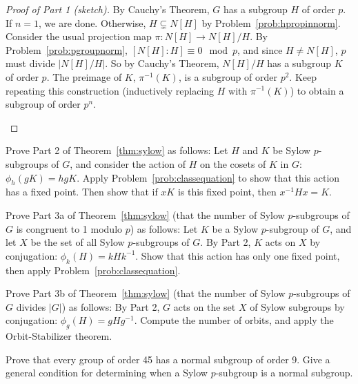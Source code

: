 \begin{proof}[Proof of Part 1 (sketch)]
 By Cauchy's Theorem, $G$ has a subgroup $H$ of order $p$. If $n=1$, we are done. Otherwise, $H \subsetneq N[H]$ by Problem~\ref{prob:hpropinnorm}. Consider the usual projection map $\pi:N[H]\longrightarrow N[H]/H$. By Problem~\ref{prob:pgroupnorm}, $[N[H]:H] \equiv 0 \mod p$, and since $H \neq N[H]$, $p$ must divide $\lvert N[H]/H \rvert$. So by Cauchy's Theorem, $N[H]/H$ has a subgroup $K$ of order $p$. The preimage of $K$, $\pi^{-1}(K)$, is a subgroup of order $p^2$. Keep repeating this construction (inductively replacing $H$ with $\pi^{-1}(K)$) to obtain a subgroup of order $p^n$.
\begin{annotation}
\end{annotation}
\end{proof}

\begin{problem}\label{prob:sylowII}
Prove Part 2 of Theorem~\ref{thm:sylow} as follows: Let $H$ and $K$ be Sylow $p$-subgroups of $G$, and consider the action of $H$ on the cosets of $K$ in $G$: $\phi_h(gK)=hgK$. Apply Problem~\ref{prob:classequation} to show that this action has a fixed point. Then show that if $xK$ is this fixed point, then $x^{-1}Hx=K$.
\end{problem}

\begin{problem}\label{prob:sylowIII}
Prove Part 3a of Theorem~\ref{thm:sylow} (that the number of Sylow $p$-subgroups of $G$ is congruent to 1 modulo $p$) as follows: Let $K$ be a Sylow $p$-subgroup of $G$, and let $X$ be the set of all Sylow $p$-subgroups of $G$. By Part 2, $K$ acts on $X$ by conjugation: $\phi_k(H) = kHk^{-1}$. Show that this action has only one fixed point, then apply Problem~\ref{prob:classequation}.
\end{problem}

\begin{problem}
Prove Part 3b of Theorem~\ref{thm:sylow} (that the number of Sylow $p$-subgroups of $G$ divides $|G|$) as follows: By Part 2, $G$ acts on the set $X$ of Sylow subgroups by conjugation: $\phi_g(H)=gHg^{-1}$. Compute the number of orbits, and apply the Orbit-Stabilizer theorem.
\end{problem}

\begin{problem}\label{prob:sylownormal}
Prove that every group of order 45 has a normal subgroup of order 9. Give a general condition for determining when a Sylow $p$-subgroup is a normal subgroup.
\begin{annotation}
\end{annotation}
\end{problem}

